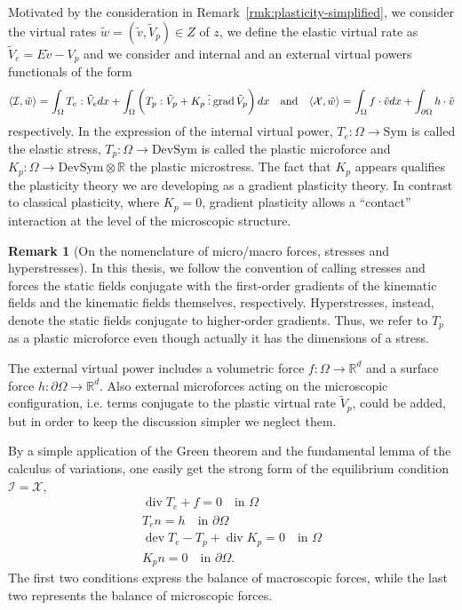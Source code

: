 \documentclass[a4paper,10pt,twoside]{amsbook}
\numberwithin{section}{chapter}
\numberwithin{equation}{chapter}
\theoremstyle{definition}
\newtheorem{rmk}[prop]{Remark}
\DeclareMathOperator{\dev}{dev}
\DeclareMathOperator{\diver}{div}
\DeclareMathOperator{\grad}{grad}
\DeclarePairedDelimiter{\dual}{\langle}{\rangle}
\newcommand{\threedots}{\mathbin{\vdots}}
\begin{document}
Motivated by the consideration in Remark~\ref{rmk:plasticity-simplified}, we consider the virtual rates $\tilde w=(\tilde v,\tilde V_p)\in Z$ of $z$, we define the elastic virtual rate as $\tilde V_e=E\tilde v-V_p$ and we consider and internal and an external virtual powers functionals of the form
\begin{equation}
\label{eqn:powers-plasticity}
\dual{\mathcal{I},\tilde w}=\int_\Omega T_e:\tilde V_edx+\int_\Omega\left(T_p:\tilde V_p+K_p\threedots\grad\tilde V_p\right)dx
\quad\text{and}\quad
\dual{\mathcal{X},\tilde w}=\int_\Omega f\cdot\tilde vdx+\int_{\partial\Omega}h\cdot\tilde v
\end{equation}
respectively. In the expression of the internal virtual power, $T_e\colon\Omega\to\text{Sym}$ is called the elastic stress, $T_p\colon\Omega\to\text{DevSym}$ is called the plastic microforce and $K_p\colon\Omega\to\text{DevSym}\otimes\mathbb{R}$ the plastic microstress. The fact that $K_p$ appears qualifies the plasticity theory we are developing as a gradient plasticity theory. In contrast to classical plasticity, where $K_p=0$, gradient plasticity allows a ``contact'' interaction at the level of the microscopic structure.
\begin{rmk}[On the nomenclature of micro/macro forces, stresses and hyperstresses]
In this thesis, we follow the convention of calling stresses and forces the static fields conjugate with the first-order gradients of the kinematic fields and the kinematic fields themselves, respectively. Hyperstresses, instead, denote the static fields conjugate to higher-order gradients. Thus, we refer to $T_p$ as a plastic microforce even though actually it has the dimensions of a stress.
\end{rmk}
The external virtual power includes a volumetric force $f\colon\Omega\to\mathbb{R}^d$ and a surface force $h\colon\partial\Omega\to\mathbb{R}^d$. Also external microforces acting on the microscopic configuration, i.e. terms conjugate to the plastic virtual rate $\tilde V_p$, could be added, but in order to keep the discussion simpler we neglect them.

By a simple application of the Green theorem and the fundamental lemma of the calculus of variations, one easily get the strong form of the equilibrium condition $\mathcal{I}=\mathcal{X}$,
\begin{subequations}
\label{eqn:equilibrium-plasticity}
\begin{gather}
\diver T_e+f=0\quad\text{in $\Omega$} \\
T_en=h\quad\text{in $\partial\Omega$} \\
\dev T_e-T_p+\diver K_p=0\quad\text{in $\Omega$} \\
K_pn=0\quad\text{in $\partial\Omega$}.
\end{gather}
\end{subequations}
The first two conditions express the balance of macroscopic forces, while the last two represents the balance of microscopic forces.
\end{document}
